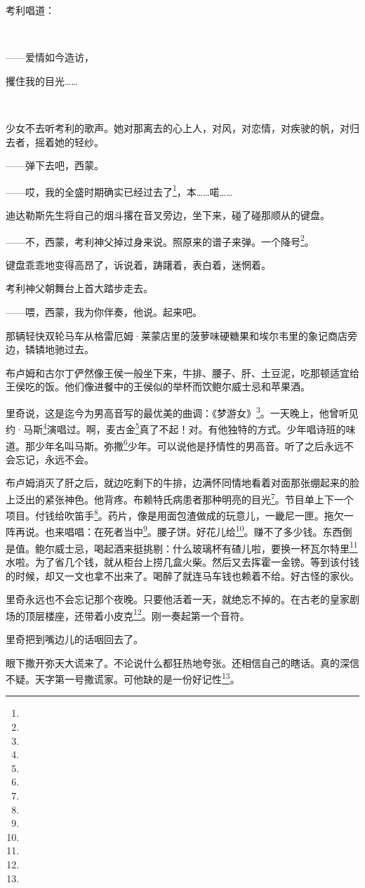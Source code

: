\par 考利唱道：
\par  
\par ——爱情如今造访，
\par 攫住我的目光……
\par  
\par 少女不去听考利的歌声。她对那离去的心上人，对风，对恋情，对疾驶的帆，对归去者，摇着她的轻纱。
\par ——弹下去吧，西蒙。
\par ——哎，我的全盛时期确实已经过去了\footnote{}，本……喏……
\par 迪达勒斯先生将自己的烟斗撂在音叉旁边，坐下来，碰了碰那顺从的键盘。
\par ——不，西蒙，考利神父掉过身来说。照原来的谱子来弹。一个降号\footnote{}。
\par 键盘乖乖地变得高昂了，诉说着，踌躇着，表白着，迷惘着。
\par 考利神父朝舞台上首大踏步走去。
\par ——喂，西蒙，我为你伴奏，他说。起来吧。
\par 那辆轻快双轮马车从格雷厄姆·莱蒙店里的菠萝味硬糖果和埃尔韦里的象记商店旁边，辚辚地驰过去。
\par 布卢姆和古尔丁俨然像王侯一般坐下来，牛排、腰子、肝、土豆泥，吃那顿适宜给王侯吃的饭。他们像进餐中的王侯似的举杯而饮鲍尔威士忌和苹果酒。
\par 里奇说，这是迄今为男高音写的最优美的曲调：《梦游女》\footnote{}。一天晚上，他曾听见约·马斯\footnote{}演唱过。啊，麦古金\footnote{}真了不起！对。有他独特的方式。少年唱诗班的味道。那少年名叫马斯。弥撒\footnote{}少年。可以说他是抒情性的男高音。听了之后永远不会忘记，永远不会。
\par 布卢姆消灭了肝之后，就边吃剩下的牛排，边满怀同情地看着对面那张绷起来的脸上泛出的紧张神色。他背疼。布赖特氏病患者那种明亮的目光\footnote{}。节目单上下一个项目。付钱给吹笛手\footnote{}。药片，像是用面包渣做成的玩意儿，一畿尼一匣。拖欠一阵再说。也来唱唱：在死者当中\footnote{}。腰子饼。好花儿给\footnote{}。赚不了多少钱。东西倒是值。鲍尔威士忌，喝起酒来挺挑剔：什么玻璃杯有碴儿啦，要换一杯瓦尔特里\footnote{}水啦。为了省几个钱，就从柜台上捞几盒火柴。然后又去挥霍一金镑。等到该付钱的时候，却又一文也拿不出来了。喝醉了就连马车钱也赖着不给。好古怪的家伙。
\par 里奇永远也不会忘记那个夜晚。只要他活着一天，就绝忘不掉的。在古老的皇家剧场的顶层楼座，还带着小皮克\footnote{}。刚一奏起第一个音符。
\par 里奇把到嘴边儿的话咽回去了。
\par 眼下撒开弥天大谎来了。不论说什么都狂热地夸张。还相信自己的瞎话。真的深信不疑。天字第一号撒谎家。可他缺的是一份好记性\footnote{}。
